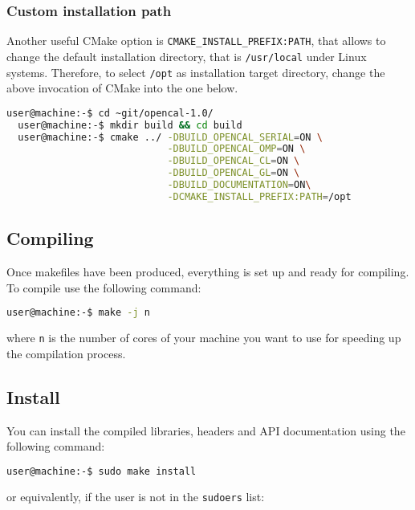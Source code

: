 \subsubsection{Custom installation path}

Another useful CMake option is \texttt{CMAKE\_INSTALL\_PREFIX:PATH},
that allows to change the default installation directory, that is
\verb'/usr/local' under Linux systems. Therefore, to select
\texttt{/opt} as installation target directory, change the above
invocation of CMake into the one below.

\begin{lstlisting}[numbers=none,language=bash,label={ch:quickstart:simplebuild}]
  user@machine:-$ cd ~git/opencal-1.0/
  user@machine:-$ mkdir build && cd build
  user@machine:-$ cmake ../ -DBUILD_OPENCAL_SERIAL=ON \
                            -DBUILD_OPENCAL_OMP=ON \
                            -DBUILD_OPENCAL_CL=ON \
                            -DBUILD_OPENCAL_GL=ON \
                            -DBUILD_DOCUMENTATION=ON\
                            -DCMAKE_INSTALL_PREFIX:PATH=/opt
\end{lstlisting}



\subsection{Compiling}
Once makefiles have been produced, everything is set up and ready for
compiling. To compile use the following command:

\begin{lstlisting}[numbers=none,language=bash,label={ch:quickstart:ebuild}]
  user@machine:-$ make -j n
\end{lstlisting}
where \verb'n' is the number of cores of your machine you want to use
for speeding up the compilation process.

\subsection{Install}

You can install the compiled libraries, headers and API documentation
using the following command:

\begin{lstlisting}[numbers=none,language=bash,label={ch:quickstart:sudoinstall}]
  user@machine:-$ sudo make install
\end{lstlisting}

\noindent or equivalently, if the user is not in the \texttt{sudoers} list:

